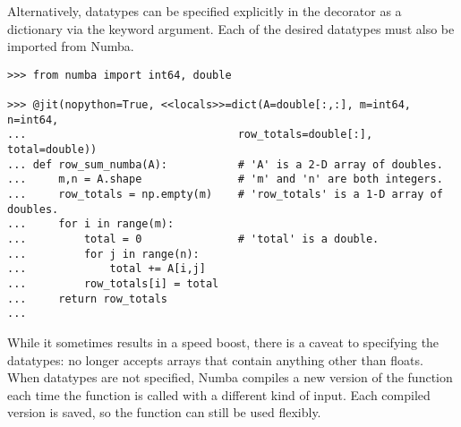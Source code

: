 Alternatively, datatypes can be specified explicitly in the  decorator as a dictionary via the  keyword argument.
Each of the desired datatypes must also be imported from Numba.

\begin{lstlisting}
>>> from numba import int64, double

>>> @jit(nopython=True, <<locals>>=dict(A=double[:,:], m=int64, n=int64,
...                                 row_totals=double[:], total=double))
... def row_sum_numba(A):           # 'A' is a 2-D array of doubles.
...     m,n = A.shape               # 'm' and 'n' are both integers.
...     row_totals = np.empty(m)    # 'row_totals' is a 1-D array of doubles.
...     for i in range(m):
...         total = 0               # 'total' is a double.
...         for j in range(n):
...             total += A[i,j]
...         row_totals[i] = total
...     return row_totals
...
\end{lstlisting}

While it sometimes results in a speed boost, there is a caveat to specifying the datatypes:  no longer accepts arrays that contain anything other than floats.
When datatypes are not specified, Numba compiles a new version of the function each time the function is called with a different kind of input.
Each compiled version is saved, so the function can still be used flexibly.

